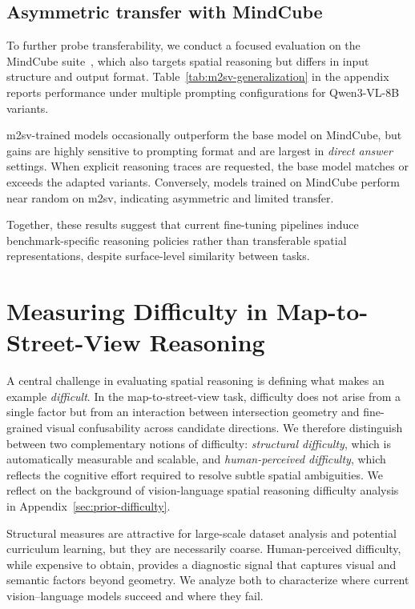 \documentclass{article}
\begin{document}
\subsection{Asymmetric transfer with MindCube}
\label{sec:results-mindcube}

To further probe transferability, we conduct a focused evaluation on the MindCube
suite~\citep{yin2025spatialmental}, which also targets spatial reasoning but
differs in input structure and output format. Table~\ref{tab:m2sv-generalization} in the appendix reports performance under
multiple prompting configurations for Qwen3-VL-8B variants.


m2sv-trained models occasionally outperform the base model on MindCube, but gains
are highly sensitive to prompting format and are largest in \emph{direct answer}
settings. When explicit reasoning traces are requested, the base model matches or
exceeds the adapted variants. Conversely, models trained on MindCube perform near
random on m2sv, indicating asymmetric and
limited transfer.

Together, these results suggest that current fine-tuning pipelines induce
benchmark-specific reasoning policies rather than transferable spatial
representations, despite surface-level similarity between tasks.

\section{Measuring Difficulty in Map-to-Street-View Reasoning}
\label{sec:analysis-difficulty}

A central challenge in evaluating spatial reasoning is defining what makes an
example \emph{difficult}. In the map-to-street-view task, difficulty does not arise
from a single factor but from an interaction between intersection geometry and
fine-grained visual confusability across candidate directions. We therefore
distinguish between two complementary notions of difficulty:
\emph{structural difficulty}, which is automatically measurable and scalable, and
\emph{human-perceived difficulty}, which reflects the cognitive effort required to
resolve subtle spatial ambiguities. We reflect on the background of vision-language spatial reasoning difficulty analysis in Appendix~\ref{sec:prior-difficulty}.

Structural measures are attractive for large-scale dataset analysis and potential
curriculum learning, but they are necessarily coarse. Human-perceived difficulty,
while expensive to obtain, provides a diagnostic signal that captures visual and
semantic factors beyond geometry. We analyze both to characterize where current
vision--language models succeed and where they fail.
\end{document}

